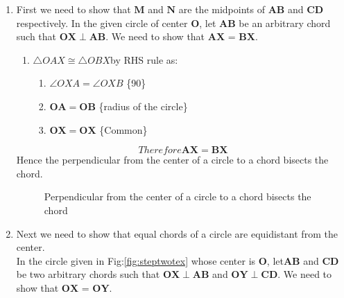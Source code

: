\renewcommand{\vec}[1]{\mathbf{#1}}
 \begin{enumerate}


\item First we need to show that $\vec{M}$ and $\vec{N}$ are the midpoints of $\vec{AB}$ and $\vec{CD}$ respectively.
In the given circle of center $\vec{O}$, let $\vec{AB}$ be an arbitrary chord such that $\vec{OX} \perp \vec{AB}$. We need to show that $\vec{AX}$ = $\vec{BX}$.
\newline
 
\begin{enumerate}
	\item $\triangle OAX \cong \triangle OBX $by RHS rule as: 
	\begin{enumerate}
	\item $\angle{OXA} = \angle{OXB} $ \quad \{90\degree\}
	\item $\vec{OA} = \vec{OB}$ \quad \{radius of the circle\}
	\item $\vec{OX} = \vec{OX}$ \quad \{Common\}
	\end{enumerate}
\end{enumerate}
\begin{equation}
	Therefore \vec{AX} = \vec{BX} \label{eq:1}
\end{equation}
	Hence the perpendicular from the center of a circle to a chord bisects the chord.
  
\begin{figure}[!ht]
\centering
\resizebox{\columnwidth}{!}{}
\caption{Perpendicular from the center of a circle to a chord bisects the chord}
\label{fig:steponetex}	
\end{figure}




\item Next we need to show that equal chords of a circle are equidistant from the center.\\

In the circle given in Fig:\ref{fig:steptwotex} whose center is $\vec{O}$, let$\vec{AB}$ and $\vec{CD}$ be two arbitrary chords such that $\vec{OX} \perp \vec{AB}$ and $\vec{OY} \perp \vec{CD}$. We need to show that $\vec{OX}$ = $\vec{OY}$.
 


\end{enumerate}
